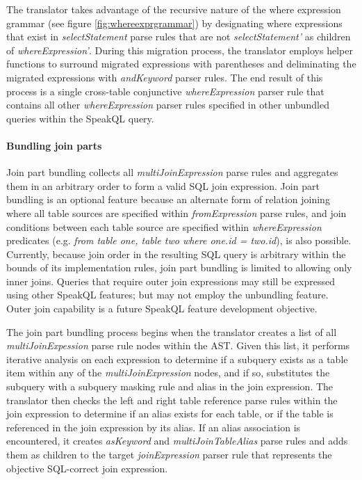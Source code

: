 The translator takes advantage of the recursive nature of the where expression grammar (see figure \ref{fig:whereexprgrammar}) by designating where expressions that exist in \emph{selectStatement} parse rules that are not \emph{selectStatement'} as children of \emph{whereExpression'}. During this migration process, the translator employs helper functions to surround migrated expressions with parentheses and deliminating the migrated expressions with \emph{andKeyword} parser rules. The end result of this process is a single cross-table conjunctive \emph{whereExpression} parser rule that contains all other \emph{whereExpression} parser rules specified in other unbundled queries within the SpeakQL query. 

\paragraph{Bundling join parts}

Join part bundling collects all \emph{multiJoinExpression} parse rules and aggregates them in an arbitrary order to form a valid SQL join expression. Join part bundling is an optional feature because an alternate form of relation joining where all table sources are specified within \emph{fromExpression} parse rules, and join conditions between each table source are specified within \emph{whereExpression} predicates (e.g. \emph{from table one, table two where one.id = two.id}), is also possible. Currently, because join order in the resulting SQL query is arbitrary within the bounds of its implementation rules, join part bundling is limited to allowing only inner joins. Queries that require outer join expressions may still be expressed using other SpeakQL features; but may not employ the unbundling feature. Outer join capability is a future SpeakQL feature development objective.


The join part bundling process begins when the translator creates a list of all \emph{multiJoinExpession} parse rule nodes within the AST. Given this list, it performs iterative analysis on each expression to determine if a subquery exists as a table item within any of the \emph{multiJoinExpression} nodes, and if so, substitutes the subquery with a subquery masking rule and alias in the join expression. The translator then checks the left and right table reference parse rules within the join expression to determine if an alias exists for each table, or if the table is referenced in the join expression by its alias. If an alias association is encountered, it creates \emph{asKeyword} and \emph{multiJoinTableAlias} parse rules and adds them as children to the target \emph{joinExpression} parser rule that represents the objective SQL-correct join expression.

